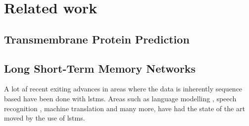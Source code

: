 \section{Related work}
\subsection{Transmembrane Protein Prediction}
% 



\subsection{Long Short-Term Memory Networks}

A lot af recent exiting advances in areas where the data is inherently sequence based 
have been done with \gls{lstms}. Areas such as language modelling \cite{JozefowiczEtAl, ShazeerEtAl},
speech recognition \cite{XiongEtAl}, machine translation \cite{WuEtAl} and many more, have had the 
state of the art moved by the use of \gls{lstms}. 

